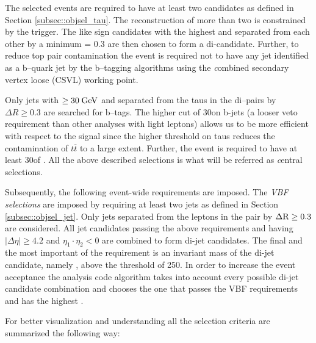 The selected events are required to have at least two \hadtau candidates as defined in Section \ref{subsec::objsel_tau}. The reconstruction of more than two \hadtau is constrained by the trigger. The like sign \hadtau candidates with the highest \pt and separated from each other by a minimum \deltar = 0.3 are then chosen to form a di-\hadtau candidate. 
Further, to reduce top pair contamination the event is required not to have any jet identified as a b--quark jet by the b--tagging algorithms using the {\textit combined secondary vertex loose} (CSVL) working point. 

Only jets with \pt $\ge 30\;\text{Ge}\kern-0.06667em\text{V}$ and separated from the taus in the di--\hadtau pairs by $\Delta R \ge 0.3$ are searched for b--tags. The higher \pt cut of 30\gev on b-jets (a looser veto requirement than other analyses with light leptons) allows us to be more efficient with respect to the signal since the higher \pt threshold on taus reduces the contamination of $t\overline{t}$ to a large extent. Further, the event is required to have at least 30\gev of \met. All the above described selections is what will be referred as {\textit central selections}.

Subsequently, the following event-wide requirements are imposed. The {\textit {VBF selections}} are imposed by requiring at least two jets as defined in Section \ref{subsec::objsel_jet}. Only jets separated from the leptons in the \hadtau\hadtau pair by $\Delta \text{R} \ge 0.3$ are considered. All jet candidates passing the above requirements and having $\vert \Delta\eta \vert \ge 4.2$ and $\eta_{1}\cdot\eta_{2} < 0$ are combined to form di-jet candidates. The final and the most important of the requirement is an invariant mass of the di-jet candidate, namely \mjj, above the threshold of 250\gev. In order to increase the event acceptance the analysis code algorithm takes into account every possible di-jet candidate combination and chooses the one that passes the VBF requirements and has the highest \mjj. 

For better visualization and understanding all the selection criteria are summarized the following way:



